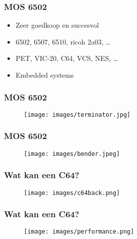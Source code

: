 \documentclass[aspectratio=43]{uva-inf-presentation}
\begin{document}

\begin{frame}
\frametitle{MOS 6502}

\begin{itemize}
\item Zeer goedkoop en succesvol
\item 6502, 6507, 6510, ricoh 2a03, \dots
\item PET, VIC-20, C64, VCS, NES, \dots
\item Embedded systems
\end{itemize}

\end{frame}


\begin{frame}
\frametitle{MOS 6502}

\begin{figure}
\texttt{[image: images/terminator.jpg]}
\end{figure}

\end{frame}


\begin{frame}
\frametitle{MOS 6502}

\begin{figure}
\texttt{[image: images/bender.jpeg]}
\end{figure}

\end{frame}


\begin{frame}
\frametitle{Wat kan een C64?}

\begin{figure}
\texttt{[image: images/c64back.png]}
\end{figure}

\end{frame}


\begin{frame}
\frametitle{Wat kan een C64?}

\begin{figure}
\texttt{[image: images/performance.png]}
\end{figure}

\end{frame}
\end{document}
